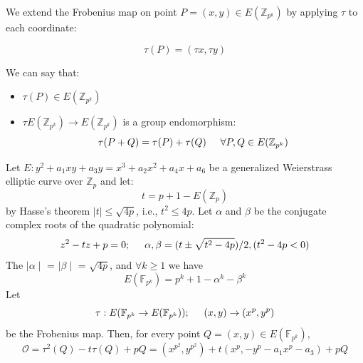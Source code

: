 \documentclass{article}
\begin{document}
\noindent We extend the Frobenius map on point \(P = (x, y) \in E(\mathbb{Z}_{p^k})\) by applying \(\tau\) to each coordinate:

\[\tau(P) = (\tau x,\tau y)\]

\noindent We can say that:
\begin{itemize}
    \item \(\tau(P) \in E(\mathbb{Z}_{p^k})\)
    \item \(\tau E(\mathbb{Z}_{p^k}) \rightarrow E(\mathbb{Z}_{p^k})\) is a group endomorphism:\[\tau(P + Q) = \tau(P) + \tau(Q) \hspace{0.5cm}\forall P,Q \in E(\mathbb{Z}_{p^k})\]
\end{itemize}

\noindent Let \(E : y^2 + a_1xy + a_3y = x^3+ a_2x^2 + a_4x + a_6\) be a generalized Weierstrass elliptic curve over \(\mathbb{Z}_{p}\) and let:
\[t = p + 1 - E(\mathbb{Z}_{p})\]
by Hasse’s theorem \(|t| \leq \sqrt{4p}\), i.e., \(t^2 \leq 4p\).\newline
Let \(\alpha\) and \(\beta\) be the conjugate complex roots of the quadratic polynomial:\newline
\[z^2 - tz + p = 0; \hspace{0.5cm} \alpha,\beta = (t \pm \sqrt{t^2 - 4p})/2,(t^2 - 4p < 0)\]
The \(\mid	\alpha \mid\) = \(\mid	\beta \mid\) = \(\sqrt{4p}\), and \(\forall k \geq 1\) we have
\[E(\mathbb{F}_{p^k}) = p^k + 1 - \alpha^k - \beta^k\]
Let
\[\tau : E(\mathbb{F}_{p^k} \rightarrow E(\mathbb{F}_{p^k})); \hspace{0.5cm} (x,y) \rightarrow (x^p , y^p) \]
be the Frobenius map. Then, for every point \(Q = (x, y) \in E(\mathbb{F}_{p^k})\),
\[\mathcal{O} = \tau^2(Q) - t\tau(Q) + pQ = (x^{p^2} , y^{p^2} ) + t(x^p, - y^p - a_1x^p - a_3) + pQ\]
\end{document}
